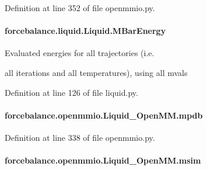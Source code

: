 Definition at line 352 of file openmmio.\-py.

\hypertarget{classforcebalance_1_1liquid_1_1Liquid_a6c00a87ae43f535118b77d41af51a5d7}{
\paragraph[{M\-Bar\-Energy}]{\setlength{\rightskip}{0pt plus 5cm}forcebalance.\-liquid.\-Liquid.\-M\-Bar\-Energy\hspace{0.3cm}{\ttfamily [inherited]}}}\label{classforcebalance_1_1liquid_1_1Liquid_a6c00a87ae43f535118b77d41af51a5d7}


Evaluated energies for all trajectories (i.\-e. 

all iterations and all temperatures), using all mvals 

Definition at line 126 of file liquid.\-py.

\hypertarget{classforcebalance_1_1openmmio_1_1Liquid__OpenMM_aaaa8d66c5bb45d847e1fbcd3953fe0d3}{
\paragraph[{mpdb}]{\setlength{\rightskip}{0pt plus 5cm}forcebalance.\-openmmio.\-Liquid\-\_\-\-Open\-M\-M.\-mpdb}}\label{classforcebalance_1_1openmmio_1_1Liquid__OpenMM_aaaa8d66c5bb45d847e1fbcd3953fe0d3}


Definition at line 338 of file openmmio.\-py.

\hypertarget{classforcebalance_1_1openmmio_1_1Liquid__OpenMM_acf60da4350bb882795a8143b1b85ca57}{
\paragraph[{msim}]{\setlength{\rightskip}{0pt plus 5cm}forcebalance.\-openmmio.\-Liquid\-\_\-\-Open\-M\-M.\-msim}}\label{classforcebalance_1_1openmmio_1_1Liquid__OpenMM_acf60da4350bb882795a8143b1b85ca57}



